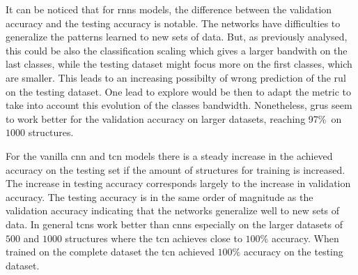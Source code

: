 \documentclass[conference]{IEEEtran}
\begin{document}
It can be noticed that for \glspl{rnn} models, the difference between the validation accuracy and the testing accuracy is notable. The networks have difficulties to generalize the patterns learned to new sets of data. But, as previously analysed, this could be also the classification scaling which gives a larger bandwith on the last classes, while the testing dataset might focus more on the first classes, which are smaller. This leads to an increasing possibilty of wrong prediction of the \gls{rul} on the testing dataset. One lead to explore would be then to adapt the metric to take into account this evolution of the classes bandwidth. Nonetheless, \glspl{gru} seem to work better for the validation accuracy on larger datasets, reaching 97\%\ on $1000$ structures.

For the vanilla \gls{cnn} and \gls{tcn} models there is a steady increase in the achieved accuracy on the testing set if the amount of structures for training is increased. The increase in testing accuracy corresponds largely to the increase in validation accuracy. The testing accuracy is in the same order of magnitude as the validation accuracy indicating that the networks generalize well to new sets of data. In general \glspl{tcn} work better than \glspl{cnn} especially on the larger datasets of $ 500 $ and $ 1000 $ structures where the \gls{tcn} achieves close to $ 100 \% $ accuracy. When trained on the complete dataset the \gls{tcn} achieved $ 100 \% $ accuracy on the testing dataset.

\end{document}
